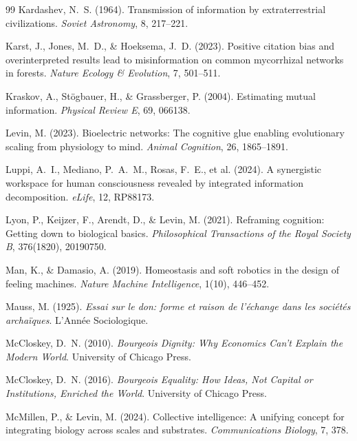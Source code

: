 \documentclass[11pt,a4paper,twocolumn]{article}
\begin{document}
\begin{thebibliography}{99}
 Kardashev, N.~S. (1964). Transmission of information by extraterrestrial civilizations. \textit{Soviet Astronomy}, 8, 217--221.

 Karst, J., Jones, M.~D., \& Hoeksema, J.~D. (2023). Positive citation bias and overinterpreted results lead to misinformation on common mycorrhizal networks in forests. \textit{Nature Ecology \& Evolution}, 7, 501--511.

 Kraskov, A., St\"ogbauer, H., \& Grassberger, P. (2004). Estimating mutual information. \textit{Physical Review E}, 69, 066138.

 Levin, M. (2023). Bioelectric networks: The cognitive glue enabling evolutionary scaling from physiology to mind. \textit{Animal Cognition}, 26, 1865--1891.

 Luppi, A.~I., Mediano, P.~A.~M., Rosas, F.~E., et al. (2024). A synergistic workspace for human consciousness revealed by integrated information decomposition. \textit{eLife}, 12, RP88173.

 Lyon, P., Keijzer, F., Arendt, D., \& Levin, M. (2021). Reframing cognition: Getting down to biological basics. \textit{Philosophical Transactions of the Royal Society B}, 376(1820), 20190750.

 Man, K., \& Damasio, A. (2019). Homeostasis and soft robotics in the design of feeling machines. \textit{Nature Machine Intelligence}, 1(10), 446--452.

 Mauss, M. (1925). \textit{Essai sur le don: forme et raison de l'\'echange dans les soci\'et\'es archa\"iques}. L'Ann\'ee Sociologique.

 McCloskey, D.~N. (2010). \textit{Bourgeois Dignity: Why Economics Can't Explain the Modern World}. University of Chicago Press.

 McCloskey, D.~N. (2016). \textit{Bourgeois Equality: How Ideas, Not Capital or Institutions, Enriched the World}. University of Chicago Press.

 McMillen, P., \& Levin, M. (2024). Collective intelligence: A unifying concept for integrating biology across scales and substrates. \textit{Communications Biology}, 7, 378.


\end{thebibliography}
\end{document}
